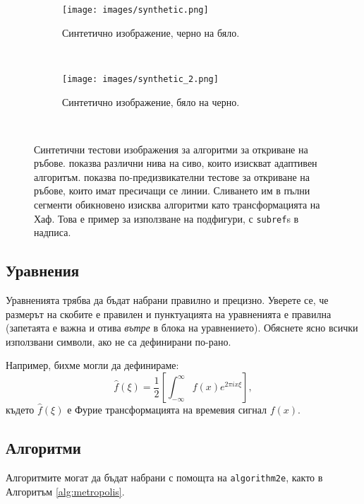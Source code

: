 \begin{figure}[htb] 
    \centering
    \begin{subfigure}[h]{0.45\textwidth}
        \texttt{[image: images/synthetic.png]}
        \caption{Синтетично изображение, черно на бяло.}
        \label{fig:syn1}
    \end{subfigure}
    ~ %
    \begin{subfigure}[h]{0.45\textwidth}
        \texttt{[image: images/synthetic\_2.png]}
        \caption{Синтетично изображение, бяло на черно.}
        \label{fig:syn2}
    \end{subfigure}
    ~ %
    \caption{Синтетични тестови изображения за алгоритми за откриване на ръбове.  показва различни нива на сиво, които изискват адаптивен алгоритъм. 
    показва по-предизвикателни тестове за откриване на ръбове, които имат пресичащи се линии. Сливането им в пълни сегменти обикновено изисква алгоритми като трансформацията на Хаф.
    Това е пример за използване на подфигури, с \texttt{subref}s в надписа.
    }\label{fig:synthetic}
\end{figure}

\clearpage

\subsection{Уравнения}

Уравненията трябва да бъдат набрани правилно и прецизно. Уверете се, че размерът на скобите е правилен и пунктуацията на уравненията е правилна 
(запетаята е важна и отива \textit{вътре} в блока на уравнението). Обяснете ясно всички използвани символи, ако не са дефинирани по-рано. 

Например, бихме могли да дефинираме:
\begin{equation}
    \hat{f}(\xi) = \frac{1}{2}\left[ \int_{-\infty}^{\infty} f(x) e^{2\pi i x \xi} \right],
\end{equation}    
където $\hat{f}(\xi)$ е Фурие трансформацията на времевия сигнал $f(x)$.

\subsection{Алгоритми}
Алгоритмите могат да бъдат набрани с помощта на \texttt{algorithm2e}, както в Алгоритъм \cref{alg:metropolis}.

